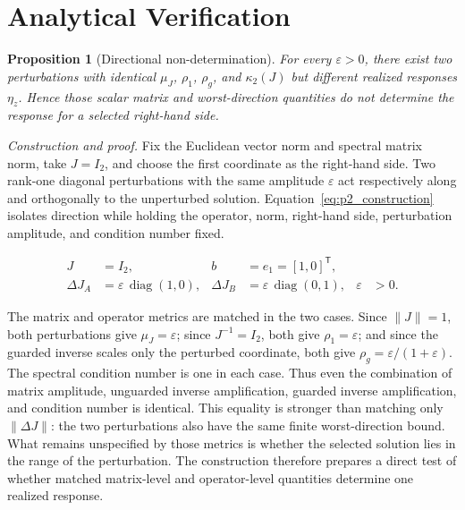\documentclass[preprint,12pt]{elsarticle}
\newtheorem{proposition}{Proposition}
\theoremstyle{definition}
\begin{document}
\FloatBarrier
\section{Analytical Verification}

\begin{proposition}[Directional non-determination]
\label{prop:p2}
For every $\varepsilon>0$, there exist two perturbations with identical
$\mu_J$, $\rho_1$, $\rho_g$, and $\kappa_2(J)$ but different realized
responses $\eta_z$. Hence those scalar matrix and worst-direction quantities
do not determine the response for a selected right-hand side.
\end{proposition}

\noindent\textit{Construction and proof.}
Fix the Euclidean vector norm and spectral matrix norm, take $J=I_2$, and choose the first coordinate as the right-hand side. Two rank-one diagonal perturbations with the same amplitude $\varepsilon$ act respectively along and orthogonally to the unperturbed solution. Equation~\eqref{eq:p2_construction} isolates direction while holding the operator, norm, right-hand side, perturbation amplitude, and condition number fixed.

\begin{linenomath*}
\begin{equation}
\begin{aligned}
J&=I_2, & b&=e_1=[1,0]^{\mathsf T},\\
\Delta J_A&=\varepsilon\,\operatorname{diag}(1,0), &
\Delta J_B&=\varepsilon\,\operatorname{diag}(0,1), & \varepsilon&>0.
\end{aligned}
\label{eq:p2_construction}
\end{equation}
\end{linenomath*}

The matrix and operator metrics are matched in the two cases. Since $\lVert J \rVert=1$, both perturbations give $\mu_J = \varepsilon$; since $J^{-1}=I_2$, both give $\rho_1 = \varepsilon$; and since the guarded inverse scales only the perturbed coordinate, both give $\rho_g = \varepsilon/(1+\varepsilon)$. The spectral condition number is one in each case. Thus even the combination of matrix amplitude, unguarded inverse amplification, guarded inverse amplification, and condition number is identical. This equality is stronger than matching only $\lVert \Delta J \rVert$: the two perturbations also have the same finite worst-direction bound. What remains unspecified by those metrics is whether the selected solution lies in the range of the perturbation. The construction therefore prepares a direct test of whether matched matrix-level and operator-level quantities determine one realized response.
\end{document}
